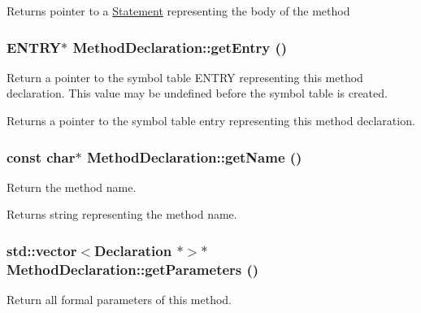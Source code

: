 \begin{DoxyReturn}{Returns}
pointer to a \hyperlink{classStatement}{Statement} representing the body of the method 
\end{DoxyReturn}
\hypertarget{classMethodDeclaration_ab32ff62da9f19c145ad13f811b97b265}{
\subsubsection[{getEntry}]{\setlength{\rightskip}{0pt plus 5cm}ENTRY$\ast$ MethodDeclaration::getEntry ()}}
\label{classMethodDeclaration_ab32ff62da9f19c145ad13f811b97b265}
Return a pointer to the symbol table ENTRY representing this method declaration. This value may be undefined before the symbol table is created.

\begin{DoxyReturn}{Returns}
a pointer to the symbol table entry representing this method declaration. 
\end{DoxyReturn}
\hypertarget{classMethodDeclaration_a792d1e64f2126f6daca537cb85e5ae6e}{
\subsubsection[{getName}]{\setlength{\rightskip}{0pt plus 5cm}const char$\ast$ MethodDeclaration::getName ()}}
\label{classMethodDeclaration_a792d1e64f2126f6daca537cb85e5ae6e}
Return the method name.

\begin{DoxyReturn}{Returns}
string representing the method name. 
\end{DoxyReturn}
\hypertarget{classMethodDeclaration_ae57ec0b65b1edcaa7c6ddf5a08304886}{
\subsubsection[{getParameters}]{\setlength{\rightskip}{0pt plus 5cm}std::vector$<${\bf Declaration} $\ast$$>$$\ast$ MethodDeclaration::getParameters ()}}
\label{classMethodDeclaration_ae57ec0b65b1edcaa7c6ddf5a08304886}
Return all formal parameters of this method.

